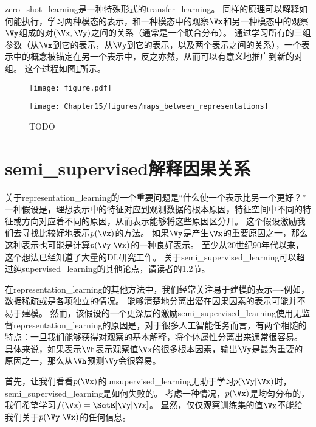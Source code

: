 \gls{zero_shot_learning}是一种特殊形式的\gls{transfer_learning}。
同样的原理可以解释如何能执行，学习两种模态的表示，和一种模态中的观察$\Vx$和另一种模态中的观察$\Vy$组成的对$(\Vx, \Vy)$之间的关系（通常是一个联合分布）\citep{Srivastava+Salakhutdinov-NIPS2012-small}。
通过学习所有的三组参数（从$\Vx$到它的表示，从$\Vy$到它的表示，以及两个表示之间的关系），一个表示中的概念被锚定在另一个表示中，反之亦然，从而可以有意义地推广到新的对组。
这个过程如图\ref{fig:chap15_maps_between_representations}所示。

\begin{figure}[!htb]
\ifOpenSource
\centerline{\texttt{[image: figure.pdf]}}
\else
\centerline{\texttt{[image: Chapter15/figures/maps\_between\_representations]}}
\fi
\caption{TODO}
\label{fig:chap15_maps_between_representations}
\end{figure}


\section{\gls{semi_supervised}解释因果关系}
\label{sec:semi_supervised_disentangling_of_causal_factors}
关于\gls{representation_learning}的一个重要问题是“什么使一个表示比另一个更好？”
一种假设是，理想表示中的特征对应到观测数据的根本原因，特征空间中不同的特征或方向对应着不同的原因，从而表示能够将这些原因区分开。
这个假设激励我们去寻找比较好地表示$p(\Vx)$的方法。
如果$\Vy$是产生$\Vx$的重要原因之一，那么这种表示也可能是计算$p(\Vy | \Vx)$的一种良好表示。
至少从20世纪90年代以来，这个想法已经知道了大量的\gls{DL}研究工作\citep{Becker92,hinton1999unsupervised}。
关于\gls{semi_supervised_learning}可以超过纯\gls{supervised_learning}的其他论点，请读者\cite{Chapelle-2006}的1.2节。


在\gls{representation_learning}的其他方法中，我们经常关注易于建模的表示----例如，数据稀疏或是各项独立的情况。
能够清楚地分离出潜在因果因素的表示可能并不易于建模。
然而，该假设的一个更深层的激励\gls{semi_supervised_learning}使用无监督\gls{representation_learning}的原因是，对于很多人工智能任务而言，有两个相随的特点：一旦我们能够获得对观察的基本解释，将个体属性分离出来通常很容易。
具体来说，如果表示$\Vh$表示观察值$\Vx$的很多根本因素，输出$\Vy$是最为重要的原因之一，那么从$\Vh$预测$\Vy$会很容易。


首先，让我们看看$p(\Vx)$的\gls{unsupervised_learning}无助于学习$p(\Vy|\Vx)$时，\gls{semi_supervised_learning}是如何失败的。
考虑一种情况，$p(\Vx)$是均匀分布的，我们希望学习$f(\Vx) = \SetE[\Vy | \Vx]$。
显然，仅仅观察训练集的值$\Vx$不能给我们关于$p(\Vy | \Vx)$的任何信息。


